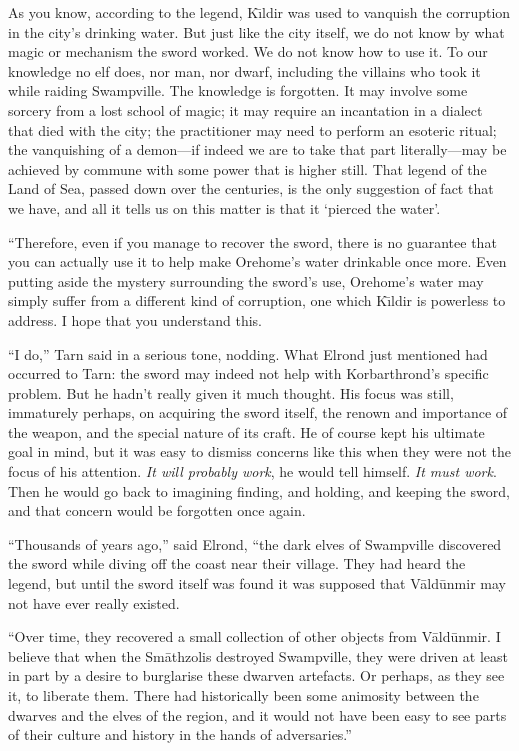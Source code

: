 As you know, according to the legend, K\=\i{}ldir was used to vanquish the corruption in the city's drinking water.  But just like the city itself, we do not know by what magic or mechanism the sword worked.  We do not know how to use it.  To our knowledge no elf does, nor man, nor dwarf, including the villains who took it while raiding Swampville.  The knowledge is forgotten.  It may involve some sorcery from a lost school of magic; it may require an incantation in a dialect that died with the city; the practitioner may need to perform an esoteric ritual; the vanquishing of a demon---if indeed we are to take that part literally---may be achieved by commune with some power that is higher still.  That legend of the Land of Sea, passed down over the centuries, is the only suggestion of fact that we have, and all it tells us on this matter is that it `pierced the water'.

``Therefore, even if you manage to recover the sword, there is no guarantee that you can actually use it to help make Orehome's water drinkable once more.  Even putting aside the mystery surrounding the sword's use, Orehome's water may simply suffer from a different kind of corruption, one which K\=\i{}ldir is powerless to address.  I hope that you understand this.

``I do,'' Tarn said in a serious tone, nodding.  What Elrond just mentioned had occurred to Tarn: the sword may indeed not help with Korbarthrond's specific problem.  But he hadn't really given it much thought.  His focus was still, immaturely perhaps, on acquiring the sword itself, the renown and importance of the weapon, and the special nature of its craft.  He of course kept his ultimate goal in mind, but it was easy to dismiss concerns like this when they were not the focus of his attention.  \emph{It will probably work}, he would tell himself.  \emph{It must work}.  Then he would go back to imagining finding, and holding, and keeping the sword, and that concern would be forgotten once again.

``Thousands of years ago,'' said Elrond, ``the dark elves of Swampville discovered the sword while diving off the coast near their village.  They had heard the legend, but until the sword itself was found it was supposed that V\=ald\=unmir may not have ever really existed.

``Over time, they recovered a small collection of other objects from V\=ald\=unmir.  I believe that when the Sm\=athzolis destroyed Swampville, they were driven at least in part by a desire to burglarise these dwarven artefacts.  Or perhaps, as they see it, to liberate them.  There had historically been some animosity between the dwarves and the elves of the region, and it would not have been easy to see parts of their culture and history in the hands of adversaries.''

